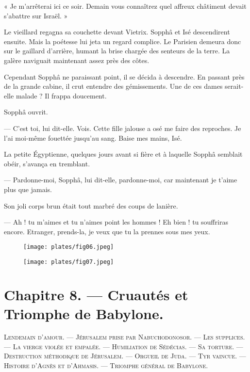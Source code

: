 \documentclass[a4paper, 11pt, oneside, polutonikogreek, french]{article}
\begin{document}
« Je m'arrêterai ici ce soir. Demain vous connaîtrez quel affreux châtiment devait s'abattre sur Israël. »

\bigskip
\centerline{\EightStarTaper}
\centerline{\EightStarTaper\EightStarTaper}
\bigskip

Le vieillard regagna sa couchette devant Vietrix. Sopphâ et Isé descendirent ensuite. Mais la poétesse lui jeta un regard complice. Le Parisien demeura donc sur le gaillard d'arrière, humant la brise chargée des senteurs de la terre. La galère naviguait maintenant assez près des côtes.

Cependant Sopphâ ne paraissant point, il se décida à descendre. En passant près de la grande cabine, il crut entendre des gémissements. Une de ces dames serait-elle malade ? Il frappa doucement.

Sopphâ ouvrit.

--- C'est toi, lui dit-elle. Vois. Cette fille jalouse a osé me faire des reproches. Je l'ai moi-même fouettée jusqu'au sang. Baise mes mains, Isé.

La petite Égyptienne, quelques jours avant si fière et à laquelle Sopphâ semblait obéir, s'avança en tremblant.

--- Pardonne-moi, Sopphâ, lui dit-elle, pardonne-moi, car maintenant je t'aime plus que jamais.

Son joli corps brun était tout marbré des coups de lanière.

--- Ah ! tu m'aimes et tu n'aimes point les hommes ! Eh bien ! tu souffriras encore. Etranger, prends-la, je veux que tu la prennes sous mes yeux.

\begin{figure}[H]
\centering
\texttt{[image: plates/fig06.jpeg]}
\end{figure}
\clearpage
\begin{figure}[H]
\centering
\texttt{[image: plates/fig07.jpeg]}
\end{figure}
\section{Chapitre 8. --- Cruautés et Triomphe de Babylone.}
\begin{center}
\scshape
\small
Lendemain d'amour. --- Jérusalem prise par Nabuchodonosor. --- Les supplices. --- La vierge violée et empalée. --- Humiliation de Sédécias. --- Sa torture. --- Destruction méthodique de Jérusalem. --- Orgueil de Juda. --- Tyr vaincue. --- Histoire d'Agnès et d'Ahmasis. --- Triomphe général de Babylone.
\end{center}
\end{document}
